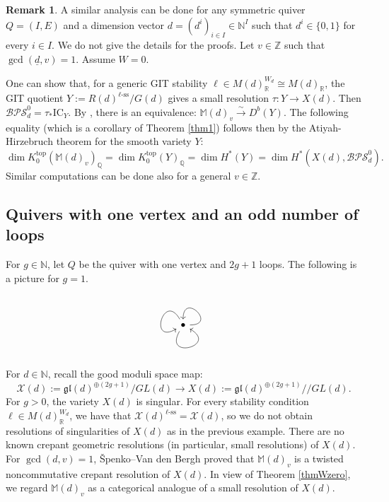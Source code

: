\documentclass [11pt,oneside,a4paper,mathscr]{amsart}
\theoremstyle{definition}
\newtheorem{remark}[thm]{Remark}
\newcommand{\X}{\mathscr{X}}
\newcommand{\dd}{\underline{d}}
\newcommand{\ssslash}{/\!\!/}
\begin{document}
\begin{remark}
  A similar analysis can be done for any symmetric quiver $Q=(I,E)$ and a dimension vector $d=(d^i)_{i\in I}\in \mathbb{N}^I$ such that $d^i\in\{0,1\}$ for every $i\in I$. We do not give the details for the proofs. Let $v\in\mathbb{Z}$ such that $\gcd(\dd, v)=1$. Assume $W=0$.
  
  One can show that, for a generic GIT stability $\ell\in M(d)^{W_d}_\mathbb{R}\cong M(d)_\mathbb{R}$, the GIT quotient $Y:=R(d)^{\ell\text{-ss}}/ G(d)$ 
  gives a small resolution
  $\tau \colon Y \to X(d)$. 
  Then $\mathcal{BPS}^0_d=\tau_*\mathrm{IC}_{Y}.$
  By \cite{hls}, there is an equivalence:
  $\mathbb{M}(d)_v\stackrel{\sim}{\to} D^b(Y)$. 
  The following equality (which is a corollary of Theorem \ref{thm1}) follows then by the Atiyah-Hirzebruch theorem for the smooth variety $Y$:
  \[\dim K^{\mathrm{top}}_0(\mathbb{M}(d)_v)_{\mathbb{Q}}= \dim K^{\mathrm{top}}_0(Y)_{\mathbb{Q}}=\dim H^{\ast}(Y)=\dim H^{\ast}(X(d), \mathcal{BPS}^0_d).\]
  Similar computations can be done also for a general $v\in \mathbb{Z}$.
\end{remark}

\subsection{Quivers with one vertex and an odd number of loops}
For $g \in \mathbb{N}$, let 
$Q$ be the quiver with one vertex and $2g+1$ loops. The following is a picture for $g=1$.
\begin{equation}\label{quiverthreeloops}
    \begin{tikzcd}
\bullet \arrow[out=0,in=90,loop,swap]
  \arrow[out=120,in=210,loop,swap]
  \arrow[out=240,in=330,loop,swap]
\end{tikzcd}
\end{equation}
For $d\in \mathbb{N}$, recall the good moduli space map:
\[\X(d):=\mathfrak{gl}(d)^{\oplus (2g+1)}/GL(d)\to X(d):=\mathfrak{gl}(d)^{\oplus (2g+1)}\ssslash GL(d).\]
For $g>0$, the variety $X(d)$ is singular.
For every stability condition $\ell\in M(d)^{W_d}_\mathbb{R}$, we have that $\X(d)^{\ell\text{-ss}}=\X(d)$, so we do not obtain resolutions of singularities of $X(d)$ as in the previous example. 
There are no known crepant geometric resolutions (in particular, small resolutions) of $X(d)$. For $\gcd(d,v)=1$, \v{S}penko--Van den Bergh \cite{SVdB} proved that $\mathbb{M}(d)_v$ is a twisted noncommutative crepant resolution of $X(d)$. In view of Theorem \ref{thmWzero}, we regard $\mathbb{M}(d)_v$ as a categorical analogue of a small resolution of $X(d)$.
\end{document}
